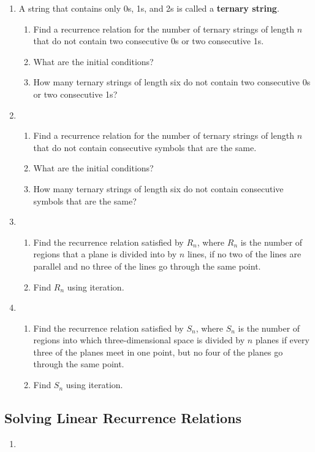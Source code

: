 \documentclass{../../cls/sig-alternate-05-2015}
\begin{document}
\begin{enumerate}
\item A string that contains only 0s, 1s, and 2s is called a \textbf{ternary string}. \begin{enumerate}
	\item Find a recurrence relation for the number of ternary
	strings of length $n$ that do not contain two consecutive
	0s or two consecutive 1s.
	\item What are the initial conditions?
	\item How many ternary strings of length six do not contain
	two consecutive 0s or two consecutive 1s?
\end{enumerate}

\item \begin{enumerate}
	\item Find a recurrence relation for the number of ternary
	strings of length $n$ that do not contain consecutive
	symbols that are the same.
	\item What are the initial conditions?
	\item How many ternary strings of length six do not contain
	consecutive symbols that are the same?
\end{enumerate}

\item \begin{enumerate}
	\item Find the recurrence relation satisfied by $R_n$,
	where $R_n$ is the number of regions that a plane is divided into by $n$ lines,
	if no two of the lines are parallel and no three of the lines go through the same point.
	\item Find $R_n$ using iteration.
\end{enumerate}

\item \begin{enumerate}
	\item Find the recurrence relation satisfied by $S_n$,
	where $S_n$ is the number of regions into which three-dimensional space is divided by $n$ planes if every three of the planes meet in one point,
	but no four of the planes go through the same point.
	\item Find $S_n$ using iteration.
\end{enumerate}

\end{enumerate}

\subsection{Solving Linear Recurrence Relations}
\begin{enumerate}
\item 
\end{enumerate}
\end{document}
